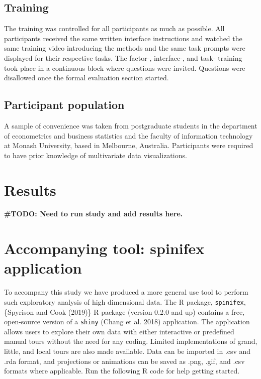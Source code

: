 \documentclass[
]{article}
\begin{document}
\hypertarget{sec:training}{%
\subsection{Training}\label{sec:training}}

The training was controlled for all participants as much as possible.
All participants received the same written interface instructions and
watched the same training video introducing the methods and the same
task prompts were displayed for their respective tasks. The factor-,
interface-, and task- training took place in a continuous block where
questions were invited. Questions were disallowed once the formal
evaluation section started.

\hypertarget{sec:population}{%
\subsection{Participant population}\label{sec:population}}

A sample of convenience was taken from postgraduate students in the
department of econometrics and business statistics and the faculty of
information technology at Monash University, based in Melbourne,
Australia. Participants were required to have prior knowledge of
multivariate data visualizations.

\hypertarget{sec:results}{%
\section{Results}\label{sec:results}}

\textbf{\#TODO: Need to run study and add results here.}

\hypertarget{sec:spinifex}{%
\section{Accompanying tool: spinifex application}\label{sec:spinifex}}

To accompany this study we have produced a more general use tool to
perform such exploratory analysis of high dimensional data. The R
package, \texttt{spinifex}, \{Spyrison and Cook (2019)\} R package
(version 0.2.0 and up) contains a free, open-source version of a
\texttt{shiny} (Chang et al. 2018) application. The application allows
users to explore their own data with either interactive or predefined
manual tours without the need for any coding. Limited implementations of
grand, little, and local tours are also made available. Data can be
imported in .csv and .rda format, and projections or animations can be
saved as .png, .gif, and .csv formats where applicable. Run the
following R code for help getting started.
\end{document}

